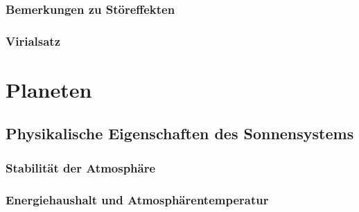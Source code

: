 \section{Bemerkungen zu Störeffekten}
\section{Virialsatz}

\part{Planeten}
\chapter{Physikalische Eigenschaften des Sonnensystems}
\section{Stabilität der Atmosphäre}
\section{Energiehaushalt und Atmosphärentemperatur}

